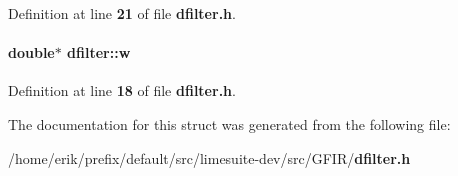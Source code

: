 Definition at line {\bf 21} of file {\bf dfilter.\+h}.

\paragraph[{w}]{\setlength{\rightskip}{0pt plus 5cm}double$\ast$ dfilter\+::w}\label{structdfilter_a5f05919892721ab84ff793af4b018ad5}


Definition at line {\bf 18} of file {\bf dfilter.\+h}.



The documentation for this struct was generated from the following file\+:\begin{DoxyCompactItemize}
\item 
/home/erik/prefix/default/src/limesuite-\/dev/src/\+G\+F\+I\+R/{\bf dfilter.\+h}\end{DoxyCompactItemize}
